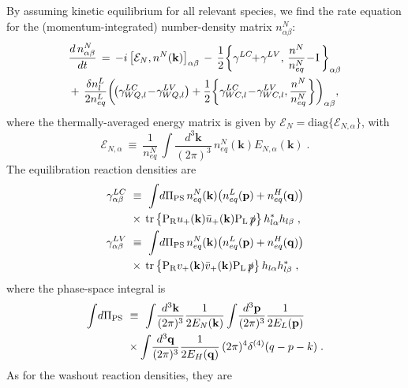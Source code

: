\documentclass[prd,twocolumn,superscriptaddress,preprintnumbers,nofootinbib,
noshowpacs,groupedaddress]{revtex4-1} %
\DeclareMathOperator{\tr}{tr}
\newcommand{\ve}[1]{\mathbf{#1}}
\begin{document}
By assuming kinetic equilibrium for all relevant species,  we find the rate equation for the (momentum-integrated) number-density matrix $n^N_{\alpha \beta}$:
\begin{align}\label{eq:rate_eq}
& \frac{d \, n^N_{\alpha \beta}}{d t}  \, = \, - i \, \big[\mathcal E_N, n^N(\ve k)\big]_{\alpha \beta} 
\, - \, \frac{1}{2} \bigg\{\gamma^{LC} \!\! + \! \gamma^{LV}, \, \frac{n^N}{n^N_{eq}} \! - \! \mathrm{I} \, \bigg\}_{\alpha \beta} \notag\\
& + \, \frac{\delta n^L_l}{2 n^L_{eq}} \bigg( \!\big( \gamma^{LC}_{WQ,l} \!-\! \gamma^{LV}_{WQ,l}\big)  +  \frac{1}{2} \bigg\{ \gamma^{LC}_{WC,l}\! - \! \gamma^{LV}_{WC,l}, \frac{n^N}{n^N_{eq}}\bigg\}\bigg)_{\alpha \beta}   ,
\end{align}
where the thermally-averaged energy matrix is given by $\mathcal{E}_N = \text{diag}\{\mathcal{E}_{N,\alpha} \}$, with
\begin{equation}\label{eq:E_av}
\mathcal E_{N,\alpha} \ \equiv \ \frac{1}{n^N_{eq}} \, \int \!\! \frac{d^3 \ve k}{(2 \pi)^3} \, n^N_{eq}(\ve k) E_{N,\alpha}(\ve k) \;.
\end{equation}
The equilibration reaction densities are
\begin{align}
\gamma^{LC}_{\alpha \beta} \ &\equiv \ \int \! d\Pi_{\rm PS} \,  n^N_{eq}(\ve k) \big(n^L_{eq} (\ve p) + n^H_{eq}(\ve q) \big) \notag\\ &\times \,   \tr \big\{\mathrm{P_R} u_+(\ve k) \bar u_+(\ve k) \mathrm{P_L}  \, \slashed{p} \big\} \, 
h^*_{l \alpha} h_{l \beta} \;, \label{eq:gamma_LC}\\
\gamma^{LV}_{\alpha \beta} \ &\equiv \ \int \! d\Pi_{\rm PS} \,  n^N_{eq}(\ve k) \big(n^L_{eq} (\ve p) + n^H_{eq}(\ve q)\big) \notag\\ &\times \,   \tr \big\{\mathrm{P_R} v_+(\ve k) \bar v_+(\ve k) \mathrm{P_L}  \, \slashed{p} \big\} \, 
h_{l \alpha} h^*_{l \beta} \;, \label{eq:gamma_LV}
\end{align}
where the phase-space integral is
\begin{align}
\int \! d\Pi_{\rm PS} \ &\equiv \ \int\! \frac{d^3 \ve k}{(2 \pi)^3} \frac{1}{2 E_N(\ve k)} \int\! \frac{d^3 \ve p}{(2 \pi)^3} \frac{1}{2 E_L(\ve p)} \notag\\
& \times \int\! \frac{d^3 \ve q}{(2 \pi)^3} \frac{1}{2 E_H(\ve q)} \, (2 \pi)^4 \delta^{(4)}(q-p-k) \;.
\end{align}
As for the washout reaction densities, they are
\end{document}
